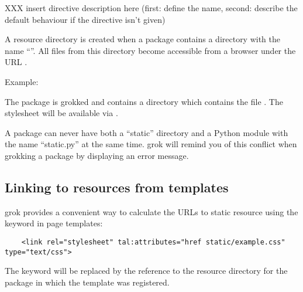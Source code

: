 XXX insert directive description here (first: define the name, second: describe
the default behaviour if the directive isn't given)

A resource directory is created when a package contains a directory with the
name ``''.  All files from this directory become accessible from a
browser under the URL
.

\begin{bf}Example:\end{bf} The package  is grokked and contains a
directory  which contains the file . The
stylesheet will be available via
.

\begin{notice}A package can never have both a ``static'' directory and a Python module
with the name ``static.py'' at the same time. grok will remind you of this
conflict when grokking a package by displaying an error message.

\end{notice}

\subsection{Linking to resources from templates}

    grok provides a convenient way to calculate the URLs to static resource
    using the keyword  in page templates:

    \begin{verbatim}
    <link rel="stylesheet" tal:attributes="href static/example.css" type="text/css">
    \end{verbatim}

    The keyword  will be replaced by the reference to the
    resource directory for the package in which the template was registered.

